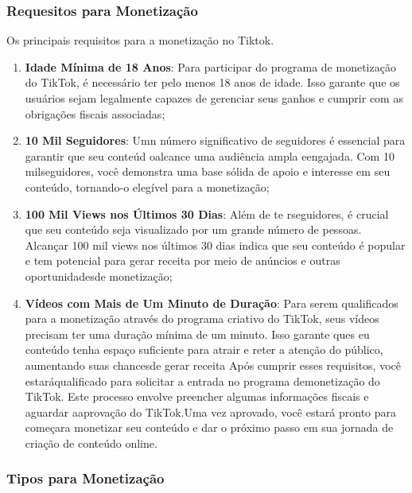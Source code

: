 \subsubsection{Requesitos para Monetização}

Os principais requisitos para a monetização no Tiktok.

\begin{enumerate}
    \item \textbf{Idade Mínima de 18 Anos}: Para participar do programa de monetização do TikTok, é necessário ter pelo menos 18 anos de idade. Isso garante que os usuários sejam legalmente capazes de gerenciar seus ganhos e cumprir com as obrigações fiscais associadas;
    \item \textbf{10 Mil Seguidores}: Umn número significativo de seguidores é essencial para garantir que seu conteúd oalcance uma audiência ampla eengajada. Com 10 milseguidores, você demonstra uma base sólida de apoio e interesse em seu conteúdo, tornando-o elegível para a monetização;
    \item \textbf{100 Mil Views nos Últimos 30 Dias}: Além de te rseguidores, é crucial que seu conteúdo seja visualizado por um grande número de pessoas. Alcançar 100 mil views nos últimos 30 dias indica que seu conteúdo é popular e tem potencial para gerar receita por meio de anúncios e outras oportunidadesde monetização;
    \item \textbf{Vídeos com Mais de Um Minuto de Duração}: Para serem qualificados para a monetização através do programa criativo do TikTok, seus vídeos precisam ter uma duração mínima de um minuto. Isso garante ques eu conteúdo tenha espaço suficiente para atrair e reter a atenção do público, aumentando suas chancesde gerar receita Após cumprir esses requisitos, você estaráqualificado para solicitar a entrada no programa demonetização do TikTok. Este processo envolve preencher algumas informações fiscais e aguardar aaprovação do TikTok.Uma vez aprovado, você estará pronto para começara monetizar seu conteúdo e dar o próximo passo em sua jornada de criação de conteúdo online.
    \end{enumerate}


\subsubsection{Tipos para Monetização}

